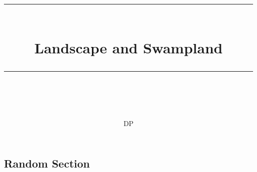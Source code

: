 \documentclass[11pt, a4paper]{article} %
\title{	
	\normalfont\normalsize
	\textsc{}\\ %
	\vspace{5pt} %
	\rule{\linewidth}{0.2pt}\\ %
	\vspace{10pt} %
	{\huge Landscape and Swampland}\\ %
	\vspace{5pt} %
	\rule{\linewidth}{-2pt}\\ %
	\vspace{-25pt} %
	\date{}
}
\author{DP}
\begin{document}
\maketitle 




\subsection*{Random Section}

\cite{Danielsson:2018ztv}







\end{document}
